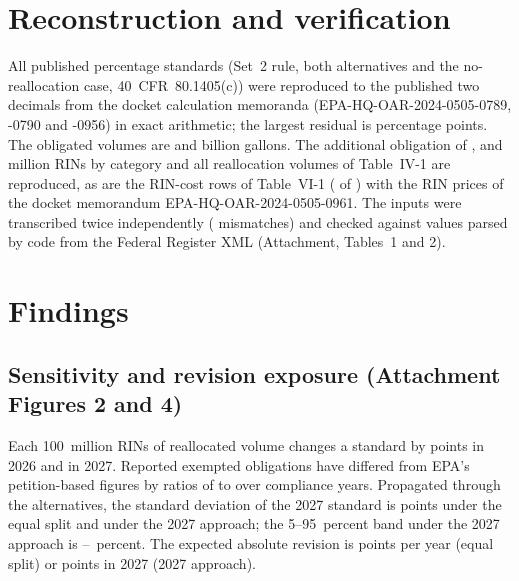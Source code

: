 \documentclass[11pt]{article}
\newcommand{\AttFigBands}{2}
\newcommand{\AttFigTradeoff}{4}
\newcommand{\AttTabInputs}{1}
\newcommand{\AttTabReconstruction}{2}
\begin{document}
\section{Reconstruction and verification}

All \valnStandardsChecked{} published percentage standards (Set~2 rule, both alternatives and the no-reallocation case, 40~CFR~80.1405(c)) were reproduced to the published two decimals from the docket calculation memoranda (EPA-HQ-OAR-2024-0505-0789, -0790 and -0956) in exact arithmetic; the largest residual is \valmaxAbsResidualPoints{} percentage points. The obligated volumes are \valdenominatorFirst{} and \valdenominatorSecond{} billion gallons. The additional obligation of \valadditionalBBD{}, \valadditionalAB{} and \valadditionalRF{} million RINs by category and all \valnTableIVOneChecked{} reallocation volumes of Table~IV-1 are reproduced, as are the RIN-cost rows of Table~VI-1 (\valnCostMatched{} of \valnCostChecked) with the RIN prices of the docket memorandum EPA-HQ-OAR-2024-0505-0961. The inputs were transcribed twice independently (\valnDoubleEntryMismatches{} mismatches) and checked against values parsed by code from the Federal Register XML (Attachment, Tables~\AttTabInputs{} and \AttTabReconstruction).

\section{Findings}

\subsection{Sensitivity and revision exposure (Attachment Figures \AttFigBands{} and \AttFigTradeoff)}
Each 100~million RINs of reallocated volume changes a standard by \valdStdPerOneZeroZeroMRinsFirst{} points in 2026 and \valdStdPerOneZeroZeroMRinsSecond{} in 2027. Reported exempted obligations have differed from EPA's petition-based figures by ratios of \valrevisionRatioMin{} to \valrevisionRatioMax{} over \valnRevisionPairs{} compliance years. Propagated through the alternatives, the standard deviation of the 2027 standard is \valstdSdSecondEqual{} points under the equal split and \valstdSdSecondAllSecond{} under the 2027 approach; the 5--95~percent band under the 2027 approach is \valstdQZeroFiveSecondAllSecond{}--\valstdQNineFiveSecondAllSecond{}~percent. The expected absolute revision is \valrevisionMeanAbsFirstEqual{} points per year (equal split) or \valrevisionMeanAbsSecondAllSecond{} points in 2027 (2027 approach).
\end{document}
